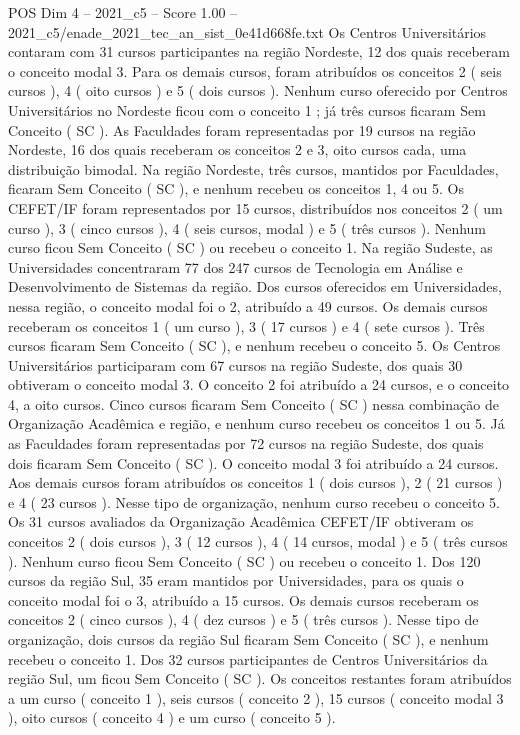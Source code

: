 \begin{textsample}{POS Dim 4 – 2021\_c5 – Score 1.00 – 2021\_c5/enade\_2021\_tec\_an\_sist\_0e41d668fe.txt}
Os Centros Universitários contaram com 31 cursos participantes na região Nordeste, 12 dos quais receberam o conceito modal 3.
Para os demais cursos, foram atribuídos os conceitos 2 ( seis cursos ), 4 ( oito cursos ) e 5 ( dois cursos ).
Nenhum curso oferecido por Centros Universitários no Nordeste ficou com o conceito 1 ; já três cursos ficaram Sem Conceito ( SC ).
As Faculdades foram representadas por 19 cursos na região Nordeste, 16 dos quais receberam os conceitos 2 e 3, oito cursos cada, uma distribuição bimodal.
Na região Nordeste, três cursos, mantidos por Faculdades, ficaram Sem Conceito ( SC ), e nenhum recebeu os conceitos 1, 4 ou 5.
Os CEFET/IF foram representados por 15 cursos, distribuídos nos conceitos 2 ( um curso ), 3 ( cinco cursos ), 4 ( seis cursos, modal ) e 5 ( três cursos ).
Nenhum curso ficou Sem Conceito ( SC ) ou recebeu o conceito 1.
Na região Sudeste, as Universidades concentraram 77 dos 247 cursos de Tecnologia em Análise e Desenvolvimento de Sistemas da região.
Dos cursos oferecidos em Universidades, nessa região, o conceito modal foi o 2, atribuído a 49 cursos.
Os demais cursos receberam os conceitos 1 ( um curso ), 3 ( 17 cursos ) e 4 ( sete cursos ).
Três cursos ficaram Sem Conceito ( SC ), e nenhum recebeu o conceito 5.
Os Centros Universitários participaram com 67 cursos na região Sudeste, dos quais 30 obtiveram o conceito modal 3.
O conceito 2 foi atribuído a 24 cursos, e o conceito 4, a oito cursos.
Cinco cursos ficaram Sem Conceito ( SC ) nessa combinação de Organização Acadêmica e região, e nenhum curso recebeu os conceitos 1 ou 5.
Já as Faculdades foram representadas por 72 cursos na região Sudeste, dos quais dois ficaram Sem Conceito ( SC ).
O conceito modal 3 foi atribuído a 24 cursos.
Aos demais cursos foram atribuídos os conceitos 1 ( dois cursos ), 2 ( 21 cursos ) e 4 ( 23 cursos ).
Nesse tipo de organização, nenhum curso recebeu o conceito 5.
Os 31 cursos avaliados da Organização Acadêmica CEFET/IF obtiveram os conceitos 2 ( dois cursos ), 3 ( 12 cursos ), 4 ( 14 cursos, modal ) e 5 ( três cursos ).
Nenhum curso ficou Sem Conceito ( SC ) ou recebeu o conceito 1.
Dos 120 cursos da região Sul, 35 eram mantidos por Universidades, para os quais o conceito modal foi o 3, atribuído a 15 cursos.
Os demais cursos receberam os conceitos 2 ( cinco cursos ), 4 ( dez cursos ) e 5 ( três cursos ).
Nesse tipo de organização, dois cursos da região Sul ficaram Sem Conceito ( SC ), e nenhum recebeu o conceito 1.
Dos 32 cursos participantes de Centros Universitários da região Sul, um ficou Sem Conceito ( SC ).
Os conceitos restantes foram atribuídos a um curso ( conceito 1 ), seis cursos ( conceito 2 ), 15 cursos ( conceito modal 3 ), oito cursos ( conceito 4 ) e um curso ( conceito 5 ).

\end{textsample}

